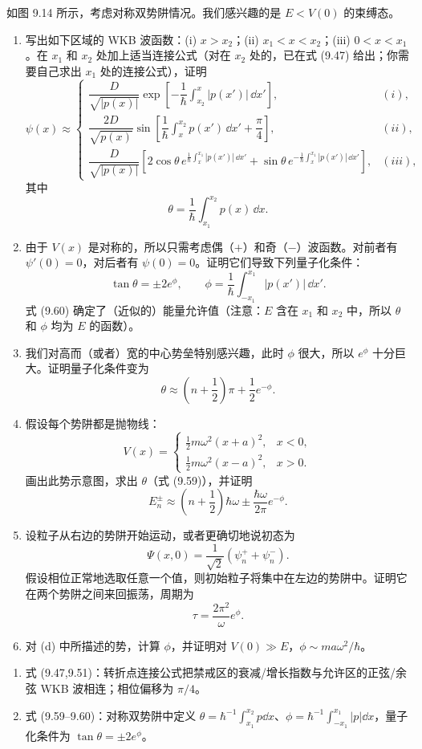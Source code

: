 \begin{question}
如图 9.14 所示，考虑对称双势阱情况。我们感兴趣的是 $E<V(0)$ 的束缚态。
\begin{enumerate}
\item 写出如下区域的 WKB 波函数：(i) $x>x_2$；(ii) $x_1<x<x_2$；(iii) $0<x<x_1$。在 $x_1$ 和 $x_2$ 处加上适当连接公式（对在 $x_2$ 处的，已在式 (9.47) 给出；你需要自己求出 $x_1$ 处的连接公式），证明
\[
\psi(x)\approx\begin{cases}
\dfrac{D}{\sqrt{|p(x)|}}\exp\left[-\dfrac{1}{\hbar}\int_{x_2}^{x}|p(x')|\,\dd x'\right], & (i),\\[1.2em]
\dfrac{2D}{\sqrt{p(x)}}\sin\left[\dfrac{1}{\hbar}\int_x^{x_2}p(x')\,\dd x'+\dfrac{\pi}{4}\right], & (ii),\\[1.2em]
\dfrac{D}{\sqrt{|p(x)|}}\left[2\cos\theta\,e^{\frac{1}{\hbar}\int_x^{x_1}|p(x')|\,\dd x'}+\sin\theta\,e^{-\frac{1}{\hbar}\int_x^{x_1}|p(x')|\,\dd x'}\right], & (iii),
\end{cases}
\]
其中
\[
\theta=\frac{1}{\hbar}\int_{x_1}^{x_2}p(x)\,\dd x.
\]
\item 由于 $V(x)$ 是对称的，所以只需考虑偶（$+$）和奇（$-$）波函数。对前者有 $\psi'(0)=0$，对后者有 $\psi(0)=0$。证明它们导致下列量子化条件：
\[
\tan\theta=\pm2e^\phi,
\qquad
\phi=\frac{1}{\hbar}\int_{-x_1}^{x_1}|p(x')|\,\dd x'.
\]
式 (9.60) 确定了（近似的）能量允许值（注意：$E$ 含在 $x_1$ 和 $x_2$ 中，所以 $\theta$ 和 $\phi$ 均为 $E$ 的函数）。
\item 我们对高而（或者）宽的中心势垒特别感兴趣，此时 $\phi$ 很大，所以 $e^\phi$ 十分巨大。证明量子化条件变为
\[
\theta\approx \left(n+\frac12\right)\pi+\frac12e^{-\phi}.
\]
\item 假设每个势阱都是抛物线：
\[
V(x)=\begin{cases}
\frac12m\omega^2(x+a)^2, & x<0,\\
\frac12m\omega^2(x-a)^2, & x>0.
\end{cases}
\]
画出此势示意图，求出 $\theta$（式 (9.59)），并证明
\[
E_n^\pm\approx\left(n+\frac12\right)\hbar\omega\pm\frac{\hbar\omega}{2\pi}e^{-\phi}.
\]
\item 设粒子从右边的势阱开始运动，或者更确切地说初态为
\[
\Psi(x,0)=\frac{1}{\sqrt2}(\psi_n^++\psi_n^-).
\]
假设相位正常地选取任意一个值，则初始粒子将集中在左边的势阱中。证明它在两个势阱之间来回振荡，周期为
\[
\tau=\frac{2\pi^2}{\omega}e^\phi.
\]
\item 对 (d) 中所描述的势，计算 $\phi$，并证明对 $V(0)\gg E$，$\phi\sim ma\omega^2/\hbar$。
\end{enumerate}

\par\smallskip
{}
\begin{enumerate}[leftmargin=2.2em,itemsep=0.12em,topsep=0.12em,parsep=0pt]
\item 式 (9.47,9.51)：转折点连接公式把禁戒区的衰减/增长指数与允许区的正弦/余弦 WKB 波相连；相位偏移为 $\pi/4$。
\item 式 (9.59--9.60)：对称双势阱中定义 $\theta=\hbar^{-1}\int_{x_1}^{x_2}p\dd x$、$\phi=\hbar^{-1}\int_{-x_1}^{x_1}|p|\dd x$，量子化条件为 $\tan\theta=\pm2e^\phi$。
\end{enumerate}

\end{question}
